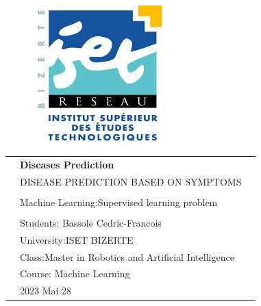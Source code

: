 \begin{center}

    \vspace*{1cm}
    
    \begin{figure}
      \raggedleft
      \begin{minipage}{4cm}
      \includegraphics[width=5cm]{images/logo-isetbz.png}
      \end{minipage}
    \end{figure}
    
    \vspace*{2cm}
    
    \vspace*{0.1in}
    
    \begin{spacing}{1.7}
    
    \begin{tabular}{p{4cm} ll}
    
    & \textbf{\huge Diseases Prediction }\\ %
    & \Large DISEASE PREDICTION BASED ON SYMPTOMS\\ %
    & \\ 
    & \large Machine Learning:Supervised learning problem \\
    
    & \\
    & \large Students: Bassole Cedric-Francois\\
    & \large University:ISET BIZERTE \\
    & \large Class:Master in Robotics and Artificial Intelligence \\
    & \large Course: Machine Learning \\
    & \large 2023 Mai 28
    \end{tabular}
    
    \end{spacing}
    
    \end{center}
    
    
    
    \thispagestyle{empty} %
    \clearpage\setcounter{page}{1} %
